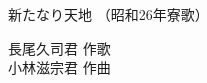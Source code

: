 \documentclass[10pt,b5j]{tarticle} %
\begin{document}
\begin{minipage}[c]{0.7\hsize} %
    \begin{center}
        {\LARGE
            新たなり天地 %
        }
        {\small 
            （昭和26年寮歌） %
        }
    \end{center}
\end{minipage}
\begin{minipage}[c]{0.3\hsize} %
    \begin{flushright} %
        長尾久司君 作歌\\小林滋宗君 作曲 %
    \end{flushright}
\end{minipage}
\end{document}
